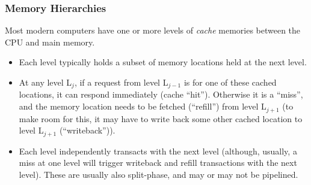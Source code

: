 \begin{frame}[fragile]
\frametitle{Memory Hierarchies}

\footnotesize

Most modern computers have one or more levels of \emph{cache} memories
between the CPU and main memory.

\vspace{1ex}

\begin{center}
\end{center}

\begin{itemize}

 \item Each level typically holds a subset of memory locations held at
       the next level.

 \PAUSE{}

 \item At any level L$_j$, if a request from level L$_{j-1}$ is for
       one of these cached locations, it can respond immediately
       (cache ``hit'').  Otherwise it is a ``miss'', and the memory
       location needs to be fetched (``refill'') from level L$_{j+1}$
       (to make room for this, it may have to write back some other
       cached location to level L$_{j+1}$ (``writeback'')).

 \PAUSE{}

 \item Each level independently transacts with the next level
       (although, usually, a miss at one level will trigger writeback
       and refill transactions with the next level).  These are
       usually also split-phase, and may or may not be pipelined.

\end{itemize}

\end{frame}


